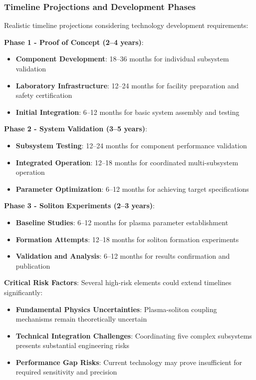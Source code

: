 \documentclass[10pt,twocolumn]{article}
\begin{document}
\subsubsection{Timeline Projections and Development Phases}
Realistic timeline projections considering technology development requirements:

\textbf{Phase 1 - Proof of Concept (2--4 years)}:
\begin{itemize}
\item \textbf{Component Development}: 18--36 months for individual subsystem validation
\item \textbf{Laboratory Infrastructure}: 12--24 months for facility preparation and safety certification
\item \textbf{Initial Integration}: 6--12 months for basic system assembly and testing
\end{itemize}

\textbf{Phase 2 - System Validation (3--5 years)}:
\begin{itemize}
\item \textbf{Subsystem Testing}: 12--24 months for component performance validation
\item \textbf{Integrated Operation}: 12--18 months for coordinated multi-subsystem operation
\item \textbf{Parameter Optimization}: 6--12 months for achieving target specifications
\end{itemize}

\textbf{Phase 3 - Soliton Experiments (2--3 years)}:
\begin{itemize}
\item \textbf{Baseline Studies}: 6--12 months for plasma parameter establishment
\item \textbf{Formation Attempts}: 12--18 months for soliton formation experiments
\item \textbf{Validation and Analysis}: 6--12 months for results confirmation and publication
\end{itemize}

\textbf{Critical Risk Factors}: Several high-risk elements could extend timelines significantly:
\begin{itemize}
\item \textbf{Fundamental Physics Uncertainties}: Plasma-soliton coupling mechanisms remain theoretically uncertain
\item \textbf{Technical Integration Challenges}: Coordinating five complex subsystems presents substantial engineering risks
\item \textbf{Performance Gap Risks}: Current technology may prove insufficient for required sensitivity and precision
\end{itemize}
\end{document}
